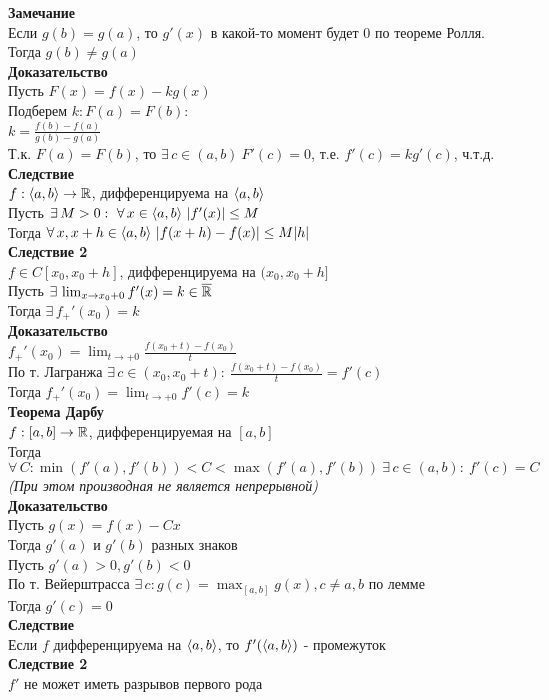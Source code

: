 \documentclass[12pt]{article}
\begin{document}
\textbf{Замечание}\\
Если $g(b)=g(a)$, то $g'(x)$ в какой-то момент будет 0 по теореме Ролля. Тогда $g(b) \neq g(a)$\\
\textbf{Доказательство}\\
Пусть $F(x) = f(x)-kg(x)$\\
Подберем $k: F(a) = F(b)$:\\
$k = \frac{f(b)-f(a)}{g(b)-g(a)}$\\
Т.к. $F(a) = F(b)$, то $\exists\,c\in (a,b)\ F'(c) = 0$, т.е. $f'(c) = k g'(c)$, ч.т.д.\\
\textbf{Следствие}\\
$f: \langle a, b \rangle \rightarrow \mathbb{R}$, дифференцируема на $\langle a, b \rangle$\\
Пусть $\exists\,M>0:\ \forall\,x\in \langle a,b \rangle\ |f'(x)| \leq M$\\
Тогда $\forall\,x,x+h \in \lan a,b\ran\ |f(x+h)-f(x)| \leq M|h|$\\
\textbf{Следствие 2}\\
$f\in C[x_0, x_0+h]$, дифференцируема на $(x_0, x_0+h]$\\
Пусть $\exists\,\lim_{x\rightarrow x_0+0} f'(x) = k\in \overline{\mathbb{R}}$\\
Тогда $\exists\,f_+'(x_0) = k$\\
\textbf{Доказательство}\\
$f_+'(x_0) = \lim_{t\rightarrow +0} \frac{f(x_0+t)-f(x_0)}{t}$\\
По т. Лагранжа $\exists\,c\in(x_0, x_0+t):\ \frac{f(x_0+t)-f(x_0)}{t} = f'(c)$\\
Тогда $f_+'(x_0) = \lim_{t\rightarrow +0} f'(c) = k$\\
\textbf{Теорема Дарбу}\\
$f:[a,b] \rightarrow \mathbb{R}$, дифференцируемая на $[a,b]$\\
Тогда $\forall\, C: \min(f'(a), f'(b)) < C < \max(f'(a), f'(b))\ \exists\,c\in (a,b):\ f'(c) = C$\\
\textit{(При этом производная не является непрерывной)}\\
\textbf{Доказательство}\\
Пусть $g(x) = f(x) - Cx$\\
Тогда $g'(a)$ и $g'(b)$ разных знаков\\
Пусть $g'(a) > 0, g'(b) < 0$\\
По т. Вейерштрасса $\exists\,c: g(c) = \max_{[a,b]} g(x), c \neq a,b$ по лемме\\
Тогда $g'(c) = 0$\\
\textbf{Следствие}\\
Если $f$ дифференцируема на $\langle a,b \rangle$, то $f'(\langle a, b \rangle)$ - промежуток\\
\textbf{Следствие 2}\\
$f'$ не может иметь разрывов первого рода\\
\end{document}
